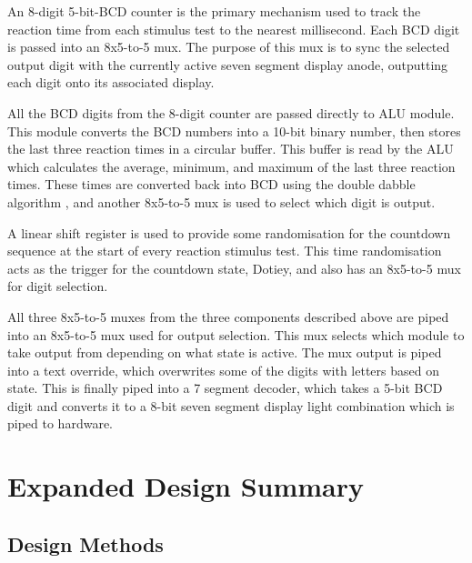 \documentclass[11pt]{article}
\begin{document}
An 8-digit 5-bit-BCD counter is the primary mechanism used to track the reaction time from each stimulus test to the nearest millisecond. Each BCD digit is passed into an 8x5-to-5 mux. The purpose of this mux is to sync the selected output digit with the currently active seven segment display anode, outputting each digit onto its associated display.

All the BCD digits from the 8-digit counter are passed directly to ALU module. This module converts the BCD numbers into a 10-bit binary number, then stores the last three reaction times in a circular buffer. This buffer is read by the ALU which calculates the average, minimum, and maximum of the last three reaction times. These times are converted back into BCD using the double dabble algorithm \cite{double_dabble}, and another 8x5-to-5 mux is used to select which digit is output.

A linear shift register is used to provide some randomisation for the countdown sequence at the start of every reaction stimulus test. This time randomisation acts as the trigger for the countdown state, Dotiey, and also has an 8x5-to-5 mux for digit selection.

All three 8x5-to-5 muxes from the three components described above are piped into an 8x5-to-5 mux used for output selection. This mux selects which module to take output from depending on what state is active. The mux output is piped into a text override, which overwrites some of the digits with letters based on state. This is finally piped into a 7 segment decoder, which takes a 5-bit BCD digit and converts it to a 8-bit seven segment display light combination which is piped to hardware.



\section{Expanded Design Summary}

\subsection{Design Methods}
\end{document}
